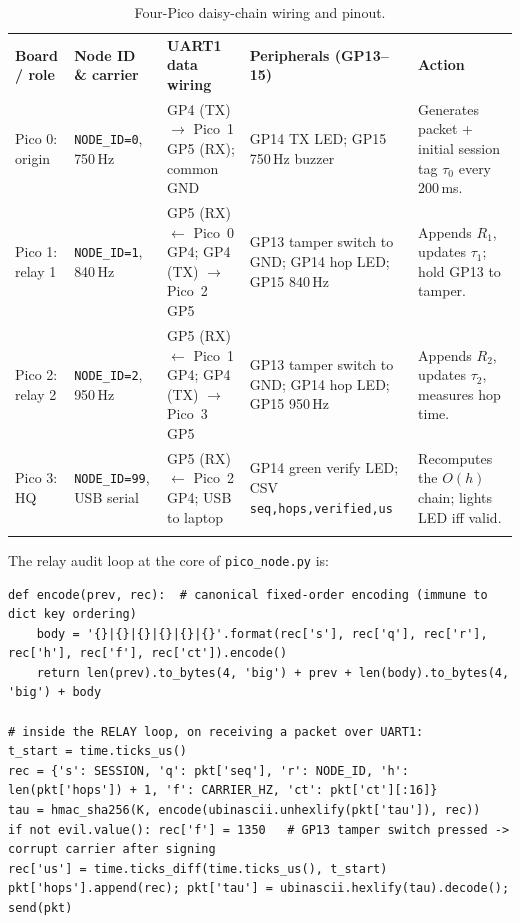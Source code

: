\documentclass[10pt,a4paper]{article}
\newcommand\toprule{\noalign{\hrule height 0.8pt\vskip 2pt}}
\newcommand\midrule{\noalign{\vskip 1pt\hrule height 0.4pt\vskip 2pt}}
\newcommand\lightrule{\noalign{\vskip 2pt}}
\newcommand\bottomrule{\noalign{\vskip 1pt\hrule height 0.8pt}}
\newcommand\thd[1]{\textbf{#1}}
\begin{document}
\begin{table}[!htb]
\caption{Four-Pico daisy-chain wiring and pinout.}\label{tab:pico}
\footnotesize
\begin{tabularx}{\textwidth}{@{}P{2.0cm}P{2.3cm}P{3.4cm}P{3.6cm}L@{}}
\toprule
\thd{Board / role} & \thd{Node ID \& carrier} & \thd{UART1 data wiring} & \thd{Peripherals (GP13--15)} & \thd{Action}\\
\midrule
Pico 0: origin & \texttt{NODE\_ID=0}, 750\,Hz & GP4 (TX) $\to$ Pico~1 GP5 (RX); common GND & GP14 TX LED; GP15 750\,Hz buzzer & Generates packet + initial session tag $\tau_0$ every 200\,ms.\\
\lightrule
Pico 1: relay 1 & \texttt{NODE\_ID=1}, 840\,Hz & GP5 (RX) $\leftarrow$ Pico~0 GP4; GP4 (TX) $\to$ Pico~2 GP5 & GP13 tamper switch to GND; GP14 hop LED; GP15 840\,Hz & Appends $R_1$, updates $\tau_1$; hold GP13 to tamper.\\
\lightrule
Pico 2: relay 2 & \texttt{NODE\_ID=2}, 950\,Hz & GP5 (RX) $\leftarrow$ Pico~1 GP4; GP4 (TX) $\to$ Pico~3 GP5 & GP13 tamper switch to GND; GP14 hop LED; GP15 950\,Hz & Appends $R_2$, updates $\tau_2$, measures hop time.\\
\lightrule
Pico 3: HQ & \texttt{NODE\_ID=99}, USB serial & GP5 (RX) $\leftarrow$ Pico~2 GP4; USB to laptop & GP14 green verify LED; CSV \texttt{seq,hops,verified,us} & Recomputes the $O(h)$ chain; lights LED iff valid.\\
\bottomrule
\end{tabularx}
\end{table}

\noindent The relay audit loop at the core of \texttt{pico\_node.py} is:
\begin{lstlisting}
def encode(prev, rec):  # canonical fixed-order encoding (immune to dict key ordering)
    body = '{}|{}|{}|{}|{}|{}'.format(rec['s'], rec['q'], rec['r'], rec['h'], rec['f'], rec['ct']).encode()
    return len(prev).to_bytes(4, 'big') + prev + len(body).to_bytes(4, 'big') + body

# inside the RELAY loop, on receiving a packet over UART1:
t_start = time.ticks_us()
rec = {'s': SESSION, 'q': pkt['seq'], 'r': NODE_ID, 'h': len(pkt['hops']) + 1, 'f': CARRIER_HZ, 'ct': pkt['ct'][:16]}
tau = hmac_sha256(K, encode(ubinascii.unhexlify(pkt['tau']), rec))
if not evil.value(): rec['f'] = 1350   # GP13 tamper switch pressed -> corrupt carrier after signing
rec['us'] = time.ticks_diff(time.ticks_us(), t_start)
pkt['hops'].append(rec); pkt['tau'] = ubinascii.hexlify(tau).decode(); send(pkt)
\end{lstlisting}
\end{document}
